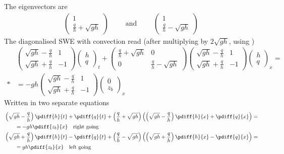 The eigenvectors are
\begin{align}
    \begin{pmatrix} 1 \\ \frac{q}{h} + \sqrt{gh} \end{pmatrix}  \qquad \mbox{ and } \qquad
    \begin{pmatrix} 1 \\ \frac{q}{h} - \sqrt{gh} \end{pmatrix}
\end{align}
The diagonalised  SWE with convection read (after multiplying by $2\sqrt{gh}$, using  \maplesoft)
\begin{align}
    &\begin{pmatrix} \sqrt{gh} - \frac{q}{h} & 1  \\ \sqrt{gh} + \frac{q}{h} & -1 \end{pmatrix}
    \begin{pmatrix} h \\ q \end{pmatrix}_t +
    \begin{pmatrix} \frac{q}{h} + \sqrt{gh}   & 0  \\
        0 & \frac{q}{h} - \sqrt{gh}  \end{pmatrix}
    \begin{pmatrix} \sqrt{gh} - \frac{q}{h} & 1  \\ \sqrt{gh} + \frac{q}{h} & -1 \end{pmatrix}
    \begin{pmatrix} h \\ q \end{pmatrix}_x = 
    \nonumber \\*
&= -gh \begin{pmatrix} \sqrt{gh} - \frac{q}{h} & 1  \\ \sqrt{gh} + \frac{q}{h} & -1 \end{pmatrix}
  \begin{pmatrix} 0  \\ z_b \end{pmatrix}_x
\end{align}
%
Written in two separate equations
\begin{align}
    &\left(\sqrt{gh} - \frac{q}{h}\right)\pdiff{h}{t} + \pdiff{q}{t} +  \left( \frac{q}{h} + \sqrt{gh}\right)\left( \left(\sqrt{gh} - \frac{q}{h} \right)\pdiff{h}{x} + \pdiff{q}{x} \right) = 
    \nonumber \\*
    &\qquad = -gh\pdiff{z_b}{x} \quad \text{right going}
    \\
    &\left(\sqrt{gh} + \frac{q}{h}\right)\pdiff{h}{t} - \pdiff{q}{t} +  \left( \frac{q}{h} - \sqrt{gh}\right)\left( \left(\sqrt{gh} + \frac{q}{h} \right)\pdiff{h}{x} - \pdiff{q}{x} \right) = 
    \nonumber \\*
    & \qquad = gh \pdiff{z_b}{x} \quad \text{left going}
\end{align}
